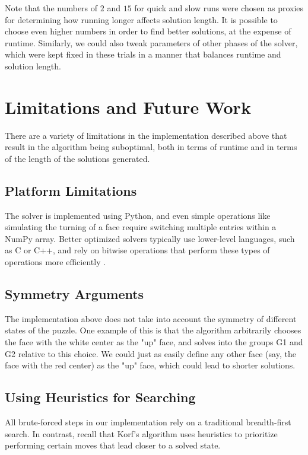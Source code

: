 \documentclass{article}
\begin{document}
Note that the numbers of $2$ and $15$ for quick and slow runs were chosen as proxies for determining how running longer affects solution length. It is possible to choose even higher numbers in order to find better solutions, at the expense of runtime. Similarly, we could also tweak parameters of other phases of the solver, which were kept fixed in these trials in a manner that balances runtime and solution length.



\section{Limitations and Future Work}

There are a variety of limitations in the implementation described above that result in the algorithm being suboptimal, both in terms of runtime and in terms of the length of the solutions generated. %

\subsection{Platform Limitations}
The solver is implemented using Python, and even simple operations like simulating the turning of a face require switching multiple entries within a NumPy array. Better optimized solvers typically use lower-level languages, such as C or C++, and rely on bitwise operations that perform these types of operations more efficiently \cite{kociemba-coord}.

\subsection{Symmetry Arguments}
The implementation above does not take into account the symmetry of different states of the puzzle. One example of this is that the algorithm arbitrarily chooses the face with the white center as the "up" face, and solves into the groups G1 and G2 relative to this choice. We could just as easily define any other face (say, the face with the red center) as the "up" face, which could lead to shorter solutions.

\subsection{Using Heuristics for Searching}
All brute-forced steps in our implementation rely on a traditional breadth-first search. In contrast, recall that Korf's algorithm uses heuristics to prioritize performing certain moves that lead closer to a solved state.
\end{document}
